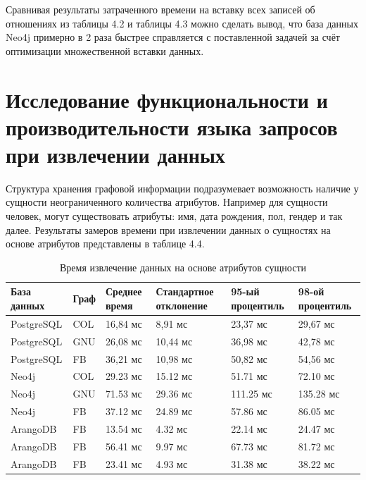 Сравнивая результаты затраченного времени на вставку всех записей об отношениях из таблицы 4.2 и таблицы 4.3 можно сделать вывод, что база данных Neo4j примерно в 2 раза быстрее справляется с поставленной задачей за счёт оптимизации множественной вставки данных.


\section{Исследование функциональности и производительности языка запросов при извлечении данных}

Структура хранения графовой информации подразумевает возможность наличие у сущности неограниченного количества атрибутов. Например для сущности человек, могут существовать атрибуты: имя, дата рождения, пол, гендер и так далее. Результаты замеров времени при извлечении данных о сущностях на основе атрибутов представлены в таблице 4.4.

\begin{table} [htbp]
    \centering\small
    \caption{Время извлечение данных на основе атрибутов сущности}
    \begin{tabular}{|p{3cm}|p{1cm}|p{2cm}|p{2cm}|p{2cm}|p{2cm}|}
        \hline
        База данных & Граф & Среднее время & Стандартное отклонение & 95-ый процентиль & 98-ой процентиль \\ \hline
        PostgreSQL  & COL  & 16,84 мс      & 8,91 мс                & 23,37 мс         & 29,67 мс         \\ \hline
        PostgreSQL  & GNU  & 26,08 мс      & 10,44 мс               & 36,98 мс         & 42,78 мс         \\ \hline
        PostgreSQL  & FB   & 36,21 мс      & 10,98 мс               & 50,82 мс         & 54,56 мс         \\ \hline
        Neo4j       & COL  & 29.23 мс      & 15.12 мс               & 51.71 мс         & 72.10 мс         \\ \hline
        Neo4j       & GNU  & 71.53 мс      & 29.36 мс               & 111.25 мс        & 135.28 мс        \\ \hline
        Neo4j       & FB   & 37.12 мс      & 24.89 мс               & 57.86 мс         & 86.05 мс         \\ \hline
        ArangoDB    & FB   & 13.54 мс      & 4.32 мс                & 22.14 мс         & 24.47 мс         \\ \hline
        ArangoDB    & FB   & 56.41 мс      & 9.97 мс                & 67.73 мс         & 81.72 мс         \\ \hline
        ArangoDB    & FB   & 23.41 мс      & 4.93 мс                & 31.38 мс         & 38.22 мс         \\ \hline
    \end{tabular}
    \normalsize
\end{table}

